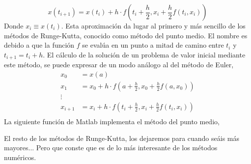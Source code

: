 \begin{equation*}
x(t_{i+1})=x(t_i)+h\cdot f(t_i+\frac{h}{2},x_i+\frac{h}{2}f(t_i,x_i))
\end{equation*}
Donde $x_i\equiv x(t_i)$. Esta aproximación da lugar al primero y más sencillo de los métodos de Runge-Kutta, conocido como método del punto medio. El nombre es debido a que la función $f$ se evalúa en un punto a mitad de camino entre $t_i$ y $t_{i+1}=t_i+h$. El cálculo de la solución de un problema de valor inicial mediante este método, se puede expresar de un modo análogo al del método de Euler, 
\begin{align*}
x_0&=x(a)\\
x_1&=x_0+h\cdot f(a+\frac{h}{2},x_0+\frac{h}{2}f(a,x_0))\\
\vdots \\
x_{i+1}&=x_i+h\cdot f(t_i+\frac{h}{2},x_i+\frac{h}{2}f(t_i,x_i))\\
\end{align*}
La siguiente función de Matlab implementa el método del punto medio,

%


El resto de los métodos de Runge-Kutta, los dejaremos para cuando seáis más mayores... Pero que conste que es de lo más interesante de los métodos numéricos.

